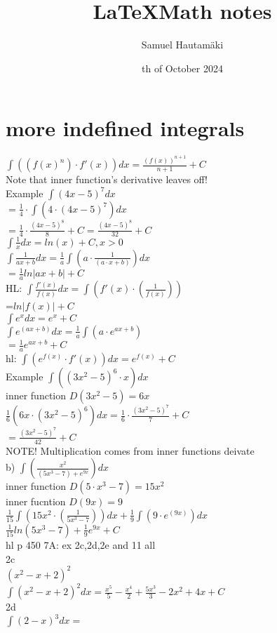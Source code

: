 \documentclass{article}
\title{\LaTeX Math notes}
\author{Samuel Hautamäki}
\date{th of October 2024}
\begin{document}
  \maketitle
   
  \section{more indefined integrals}
  $\int ((f(x)^n)\cdot f'(x))dx=\frac{(f(x))^{n+1}}{n+1}+C$\\
  Note that inner function's derivative leaves off!\\
  Example $\int (4x-5)^7 dx$\\
  $=\frac{1}{4}\cdot \int(4\cdot (4x-5)^7)dx$\\
  $=\frac{1}{4}\cdot\frac{(4x-5)^8}{8}+C=\frac{(4x-5)^8}{32}+C$\\
  $\int \frac{1}{x}dx= ln(x)+C, x>0$\\
  $\int \frac{1}{ax+b}dx=\frac{1}{a}\int(a\cdot \frac{1}{(a\cdot x+b)})dx$\\
  $=\frac{1}{a}ln|ax+b|+C$\\
  HL: $\int \frac{f'(x)}{f(x)} dx=\int (f'(x)\cdot(\frac{1}{f(x)}))$\\
  =$ln|f(x)|+C$\\
  $\int e^x dx=e^x+C$\\
  $\int e^{(ax+b)} dx=\frac{1}{a}\int (a\cdot e^{ax+b})$\\
  $=\frac{1}{a}e^{ax+b}+C$\\
  hl: $\int(e^{f(x)}\cdot f'(x))dx=e^{f(x)}+C$\\
  Example $\int((3x^2-5)^6\cdot x)dx$\\
  inner function $D (3x^2-5)=6x$\\
  $\frac{1}{6}(6x\cdot(3x^2-5)^6)dx=\frac{1}{6}\cdot\frac{(3x^2-5)^7}{7}+C$\\
  $=\frac{(3x^2-5)^7}{42}+C$\\
  NOTE! Multiplication comes from inner functions deivate\\
  b) $\int(\frac{x^2}{(5x^3-7)+e^{9x}})dx$\\
  inner function $D (5\cdot x^3-7)=15x^2$\\
  inner fucntion $D (9x)=9$\\
  $\frac{1}{15}\int(15x^2\cdot(\frac{1}{5x^3-7}))dx+\frac{1}{9}\int(9\cdot e^{(9x)})dx$\\
  $\frac{1}{15} ln(5x^3-7)+\frac{1}{9}e^{9x}+C$\\
  hl p 450 7A: ex 2c,2d,2e and 11 all\\
  2c\\
  $(x^2-x+2)^2$\\
  $\int(x^2-x+2)^2 dx=\frac{x^5}{5}-\frac{x^4}{2}+\frac{5x^3}{3}-2x^2+4x+C$\\
  2d\\
  $\int (2-x)^3dx=$
  

   
\end{document}
